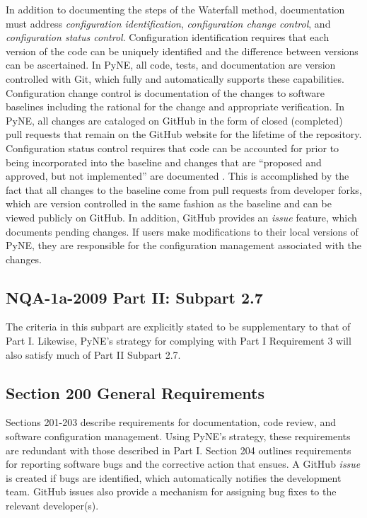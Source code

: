 \documentclass{anstrans}
\begin{document}
In addition to documenting the steps of the Waterfall method,
documentation must address \emph{configuration identification}, \emph{configuration change
control}, and \emph{configuration status control}. Configuration identification
requires that each version of the code can be uniquely identified and the
difference between versions can be ascertained. In PyNE, all code, tests, and
documentation are version controlled with Git, which fully and automatically 
supports these
capabilities. Configuration change control is documentation of the changes to
software baselines including the rational for the change and appropriate
verification. In PyNE, all changes are cataloged on GitHub in the form of closed (completed) pull
requests that remain on the GitHub website for the lifetime of the repository.
Configuration status control requires that code can be accounted for prior to
being incorporated into the baseline and changes that are ``proposed and approved,
but not implemented'' are documented \cite{add}. This is accomplished by the fact that all
changes to the baseline come from pull requests from developer forks, which are
version controlled in the same fashion as the baseline and can be viewed publicly on GitHub. In addition, GitHub
provides an \emph{issue} feature, which documents pending changes. If users make modifications to their local versions of PyNE, they are responsible for the configuration management associated with the changes.


\subsection{NQA-1a-2009 Part II: Subpart 2.7}

The criteria in this subpart are explicitly stated to be supplementary to that
of Part I. Likewise, PyNE's strategy for complying with Part I Requirement 3 will also satisfy much of Part II Subpart 2.7.

\subsection{Section 200 General Requirements}

Sections 201-203 describe requirements for documentation, code review, and
software configuration management. Using PyNE's strategy, these requirements are redundant with those described in Part I.
Section 204 outlines requirements for reporting software bugs and the corrective
action that ensues. A GitHub \emph{issue} is created if bugs are identified, which
automatically notifies the development team. GitHub
issues also provide a mechanism for assigning bug fixes to the relevant
developer(s). 
\end{document}
